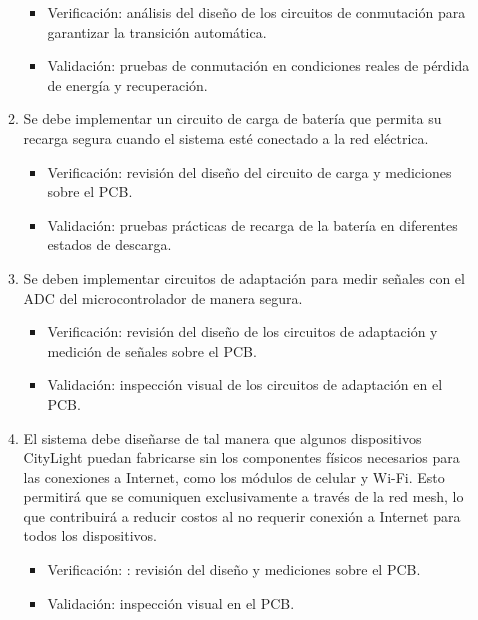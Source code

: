 \documentclass[
11pt, %
]{charter}
\begin{document}
\begin{enumerate}
\begin{enumerate}
				\begin{itemize}
				\item Verificación: análisis del diseño de los circuitos de conmutación para garantizar la transición automática.
				\item Validación: pruebas de conmutación en condiciones reales de pérdida de energía y recuperación.
				\end{itemize}
			\item Se debe implementar un circuito de carga de batería que permita su recarga segura cuando el sistema esté conectado a la red eléctrica.
				\begin{itemize}
				\item Verificación: revisión del diseño del circuito de carga y mediciones sobre el PCB.
				\item Validación: pruebas prácticas de recarga de la batería en diferentes estados de descarga.
				\end{itemize}
			\item Se deben implementar circuitos de adaptación para medir señales con el ADC del microcontrolador de manera segura.
				\begin{itemize}
				\item Verificación: revisión del diseño de los circuitos de adaptación y medición de señales sobre el PCB.
				\item Validación: inspección visual de los circuitos de adaptación en el PCB.
				\end{itemize}
			\item El sistema debe diseñarse de tal manera que algunos dispositivos CityLight puedan fabricarse sin los componentes físicos necesarios para las conexiones 
				 a Internet, como los módulos de celular y Wi-Fi. Esto permitirá que se comuniquen exclusivamente a través de la red mesh, lo que contribuirá a reducir costos al no requerir conexión a Internet para todos los dispositivos.
				\begin{itemize}
				\item Verificación: : revisión del diseño y mediciones sobre el PCB.
				\item Validación: inspección visual en el PCB.
				\end{itemize}
		\end{enumerate}


\end{enumerate}
\end{document}
